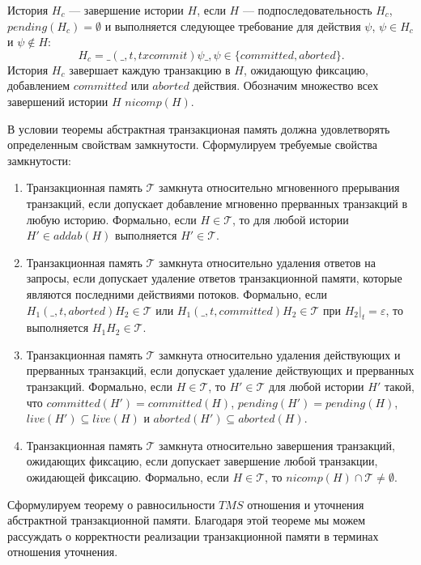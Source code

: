 \begin{mydefinition} История $H_c$ --- завершение истории $H$, если $H$ --- подпоследовательность $H_c$, $pending(H_c) = \emptyset$ и выполняется следующее требование для действия $\psi$, $\psi \in H_c$ и $\psi \notin H$: $$H_c = \_(\_, t, txcommit)\psi\_, \psi \in \{committed, aborted\}.$$
История $H_c$ завершает каждую транзакцию в $H$, ожидающую фиксацию, добавлением $committed$ или $aborted$ действия. Обозначим множество всех завершений истории $H$ $nicomp(H)$.
\end{mydefinition}

В условии теоремы абстрактная транзакционая память должна удовлетворять определенным свойствам замкнутости. Сформулируем требуемые свойства замкнутости:
\begin{enumerate}
\item Транзакционная память $\mathcal{T}$ замкнута относительно мгновенного прерывания транзакций, если допускает добавление мгновенно прерванных транзакций в любую историю. Формально, если $H \in \mathcal{T}$, то для любой истории $H' \in addab(H)$ выполняется $H' \in \mathcal{T}$.  
\item Транзакционная память $\mathcal{T}$ замкнута относительно удаления ответов на запросы, если допускает удаление ответов транзакционной памяти, которые являются последними действиями потоков. Формально, если $H_1(\_, t, aborted)H_2 \in \mathcal{T}$ или $H_1(\_, t, committed)H_2 \in \mathcal{T}$ при $H_2|_t = \varepsilon$, то выполняется $H_1H_2 \in \mathcal{T}$.
\item Транзакционная память $\mathcal{T}$ замкнута относительно удаления действующих и прерванных транзакций, если допускает удаление действующих и прерванных транзакций. Формально, если $H \in \mathcal{T}$, то $H' \in \mathcal{T}$ для любой истории $H'$ такой, что $committed(H') = committed(H)$, $pending(H') = pending(H)$, $live(H') \subseteq live(H)$ и $aborted(H') \subseteq aborted(H)$. 
\item Транзакционная память $\mathcal{T}$ замкнута относительно завершения транзакций, ожидающих фиксацию, если допускает завершение любой транзакции, ожидающей фиксацию. Формально, если $H \in \mathcal{T}$, то $nicomp(H) \cap \mathcal{T} \neq \emptyset$. 
\end{enumerate}

Сформулируем теорему о равносильности $TMS$ отношения и уточнения абстрактной транзакционной памяти. Благодаря этой теореме мы можем рассуждать о корректности реализации транзакционной памяти в терминах отношения уточнения.

